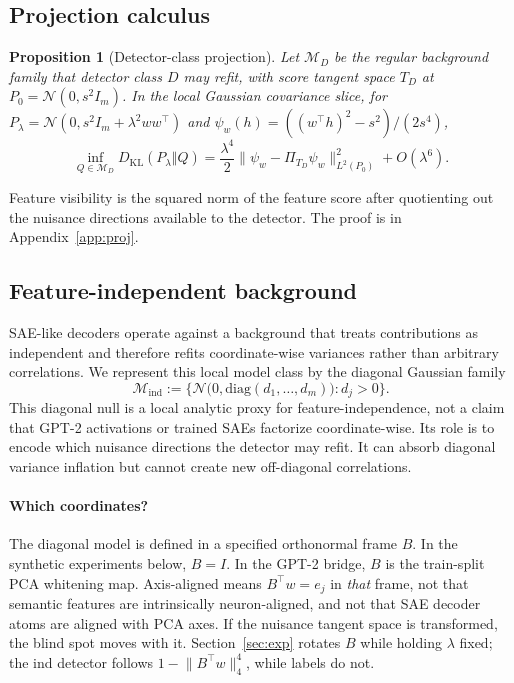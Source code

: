 \documentclass{article}
\theoremstyle{plain}
\newtheorem{proposition}{Proposition}
\newcommand{\Mind}{\mathcal{M}_{\mathrm{ind}}}
\begin{document}
\subsection{Projection calculus}
\begin{proposition}[Detector-class projection]
\label{prop:proj}
Let $\mathcal{M}_D$ be the regular background family that detector class $D$ may refit, with score tangent space $T_D$ at $P_0=\mathcal{N}(0,s^2 I_m)$. In the local Gaussian covariance slice, for $P_\lambda=\mathcal{N}(0,s^2 I_m+\lambda^2 ww^{\top})$ and $\psi_w(h)=((w^{\top}h)^2-s^2)/(2s^4)$,
\begin{equation}
\inf_{Q\in\mathcal{M}_D} D_{\mathrm{KL}}(P_\lambda\Vert Q)=\frac{\lambda^4}{2}\bigl\lVert \psi_w-\Pi_{T_D}\psi_w\bigr\rVert_{L^2(P_0)}^2+O(\lambda^6).
\end{equation}
\end{proposition}
Feature visibility is the squared norm of the feature score after quotienting out the nuisance directions available to the detector. The proof is in Appendix~\ref{app:proj}.

\subsection{Feature-independent background}
\label{sec:coords}
SAE-like decoders operate against a background that treats contributions as independent and therefore refits coordinate-wise variances rather than arbitrary correlations. We represent this local model class by the diagonal Gaussian family
\begin{equation}
\Mind:=\bigl\{\mathcal{N}\bigl(0,\mathrm{diag}(d_1,\ldots,d_m)\bigr):d_j>0\bigr\}.
\end{equation}
This diagonal null is a local analytic proxy for feature-independence, not a claim that GPT-2 activations or trained SAEs factorize coordinate-wise. Its role is to encode which nuisance directions the detector may refit. It can absorb diagonal variance inflation but cannot create new off-diagonal correlations.

\paragraph{Which coordinates?}
The diagonal model is defined in a specified orthonormal frame $B$. In the synthetic experiments below, $B=I$. In the GPT-2 bridge, $B$ is the train-split PCA whitening map. Axis-aligned means $B^{\top}w=e_j$ in \emph{that} frame, not that semantic features are intrinsically neuron-aligned, and not that SAE decoder atoms are aligned with PCA axes. If the nuisance tangent space is transformed, the blind spot moves with it. Section~\ref{sec:exp} rotates $B$ while holding $\lambda$ fixed; the ind detector follows $1-\lVert B^{\top}w\rVert_4^4$, while labels do not.
\end{document}
